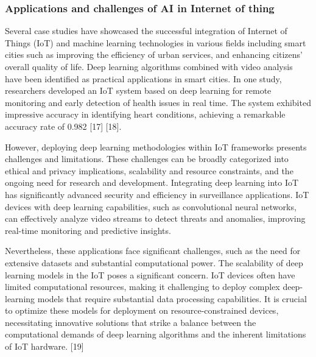 \subsubsection{Applications and challenges of AI in Internet of thing}
Several case studies have showcased the successful integration of Internet of Things (IoT) and machine learning technologies in various fields including smart cities such as improving the efficiency of urban services, and enhancing citizens' overall quality of life. 
Deep learning algorithms combined with video analysis have been identified as practical applications in smart cities. 
In one study, researchers developed an IoT system based on deep learning for remote monitoring and early detection of health issues in real time. 
The system exhibited impressive accuracy in identifying heart conditions, achieving a remarkable accuracy rate of 0.982 [17] [18].

However, deploying deep learning methodologies within IoT frameworks presents challenges and limitations. These challenges can be broadly categorized into ethical and privacy implications, scalability and resource constraints, and the ongoing need for research and development.
Integrating deep learning into IoT has significantly advanced security and efficiency in surveillance applications. IoT devices with deep learning capabilities, such as convolutional neural networks, can effectively analyze video streams to detect threats and anomalies, improving real-time monitoring and predictive insights.

Nevertheless, these applications face significant challenges, such as the need for extensive datasets and substantial computational power.
The scalability of deep learning models in the IoT poses a significant concern. IoT devices often have limited computational resources, making it challenging to deploy complex deep-learning models that require substantial data processing capabilities.
It is crucial to optimize these models for deployment on resource-constrained devices, necessitating innovative solutions that strike a balance between the computational demands of deep learning algorithms and the inherent limitations of IoT hardware. [19]
